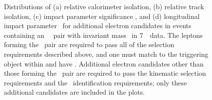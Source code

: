 \begin{figure}[h]
\centering
\caption[ Distributions of relative track and calorimeter isolation, \dzerosig\
and \zzero\ for additional electron candidates in events containing a dilepton pair with
mass \sstooos\ in 7~\tev\ data.]{Distributions of (a) relative calorimeter isolation, (b)
relative track isolation, (c) impact parameter significance \dzerosig,
and (d) longitudinal impact parameter \zzero\ for additional electron candidates in events
containing an \ossf\ \dilepton\ pair with
invariant mass \sstooos\ in 7~\tev\ data. The leptons forming the \dilepton\ pair are required to pass all of
the selection requirements described above, and one must match to the triggering
object within \deltaRlt{0.1} and have \ptgt{25}. Additional electron candidates other than those forming the
\dilepton\ pair are required to pass
the kinematic selection requirements and the \loosePP\ identification
requirements; only these additional candidates are included in the plots.}
\label{fig:objsel-el}
\end{figure}

